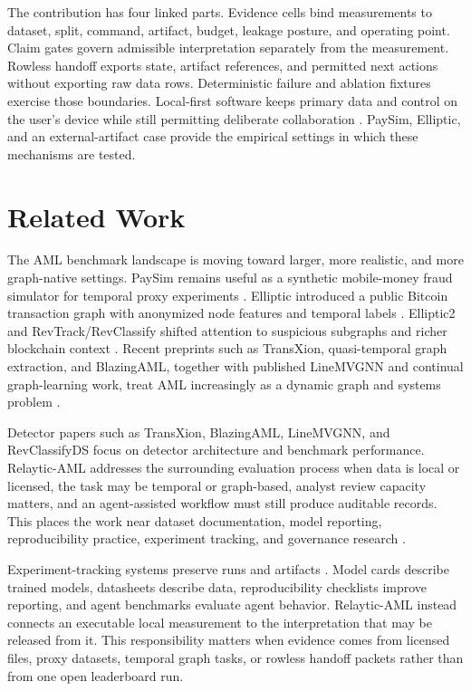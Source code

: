 \documentclass[11pt]{article}
\begin{document}
The contribution has four linked parts. Evidence cells bind measurements to dataset, split, command, artifact, budget, leakage posture, and operating point. Claim gates govern admissible interpretation separately from the measurement. Rowless handoff exports state, artifact references, and permitted next actions without exporting raw data rows. Deterministic failure and ablation fixtures exercise those boundaries. Local-first software keeps primary data and control on the user's device while still permitting deliberate collaboration \citep{kleppmann2019localfirst}. PaySim, Elliptic, and an external-artifact case provide the empirical settings in which these mechanisms are tested.

\section{Related Work}

The AML benchmark landscape is moving toward larger, more realistic, and more graph-native settings. PaySim remains useful as a synthetic mobile-money fraud simulator for temporal proxy experiments \citep{lopezrojas2016paysim}. Elliptic introduced a public Bitcoin transaction graph with anonymized node features and temporal labels \citep{weber2019elliptic}. \mbox{Elliptic2} and RevTrack/RevClassify shifted attention to suspicious subgraphs and richer blockchain context \citep{bellei2024elliptic2,song2024revtrack}. Recent preprints such as TransXion, quasi-temporal graph extraction, and BlazingAML, together with published LineMVGNN and continual graph-learning work, treat AML increasingly as a dynamic graph and systems problem \citep{chen2026transxion,poon2025linemvgnn,tariq2026extraqt,ye2026blazingaml,deprez2025continualaml}.

Detector papers such as TransXion, BlazingAML, LineMVGNN, and RevClassifyDS focus on detector architecture and benchmark performance. Relaytic-AML addresses the surrounding evaluation process when data is local or licensed, the task may be temporal or graph-based, analyst review capacity matters, and an agent-assisted workflow must still produce auditable records. This places the work near dataset documentation, model reporting, reproducibility practice, experiment tracking, and governance research \citep{gebru2021datasheets,mitchell2019modelcards,pineau2021reproducibility,zaharia2018mlflow}.

Experiment-tracking systems preserve runs and artifacts \citep{zaharia2018mlflow}. Model cards describe trained models, datasheets describe data, reproducibility checklists improve reporting, and agent benchmarks evaluate agent behavior. Relaytic-AML instead connects an executable local measurement to the interpretation that may be released from it. This responsibility matters when evidence comes from licensed files, proxy datasets, temporal graph tasks, or rowless handoff packets rather than from one open leaderboard run.
\end{document}
